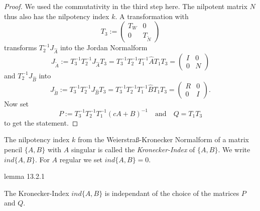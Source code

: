 \begin{proof}
	We used the commutativity in the third step here. The nilpotent matrix $N$ thus also has the nilpotency index $k$. A transformation with
	\begin{displaymath}
		T_3 := 
		\left(
		\begin{matrix}
			T_W & 0 \\
			0 & T_{\tilde{N}}
		\end{matrix}
		\right)
	\end{displaymath}
	transforms $T_2^{-1}J_{\hat{A}}$ into the Jordan Normalform
	\begin{displaymath}
		J_{\tilde{A}} := T_3^{-1}T_2^{-1}J_{\hat{A}}T_3 = T_3^{-1}T_2^{-1}T_1^{-1}\hat{A}T_1T_3 = 
		\left(
		\begin{matrix}
			I & 0 \\
			0 & N
		\end{matrix}
		\right)
	\end{displaymath}
	and $T_2^{-1}J_{\hat{B}}$ into
	\begin{displaymath}
		J_{\tilde{B}} := T_3^{-1}T_2^{-1}J_{\hat{B}}T_3 = T_3^{-1}T_2^{-1}T_1^{-1}\hat{B}T_1T_3 = 
		\left(
		\begin{matrix}
			R & 0 \\
			0 & I
		\end{matrix}
		\right) .
	\end{displaymath}
	Now set
	\begin{displaymath}
		P:= T_3^{-1}T_2^{-1}T_1^{-1}(cA+B)^{-1} \quad \text{and} \quad Q = T_1T_3
	\end{displaymath}
	to get the statement.
\end{proof}

\begin{definition}
	The nilpotency index $k$ from the Weierstraß-Kronecker Normalform of a matrix pencil $\{A,B\}$ with $A$ singular is called the \emph{Kronecker-Index} of $\{A,B\}$. We write $ind\{A,B\}$. For $A$ regular we set $ind\{A,B\} = 0$.
\end{definition}

lemma 13.2.1

\begin{lemma}
	The Kronecker-Index $ind\{A,B\}$ is independant of the choice of the matrices $P$ and $Q$.
\end{lemma}


